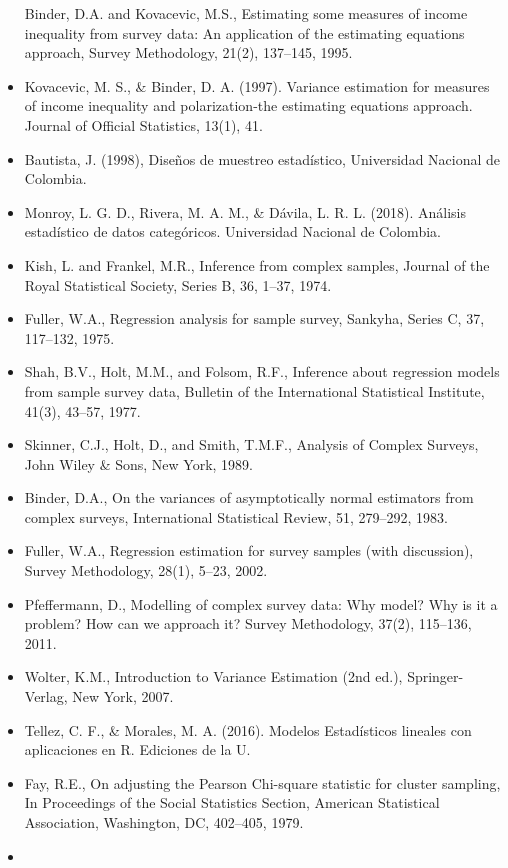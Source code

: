 \documentclass[
  12pt,
]{book}
\begin{document}
\begin{itemize}
  Binder, D.A. and Kovacevic, M.S., Estimating some measures of income inequality from survey data: An application of the estimating equations approach, Survey Methodology, 21(2), 137--145, 1995.
\item
  Kovacevic, M. S., \& Binder, D. A. (1997). Variance estimation for measures of income inequality and polarization-the estimating equations approach. Journal of Official Statistics, 13(1), 41.
\item
  Bautista, J. (1998), Diseños de muestreo estadístico, Universidad Nacional de Colombia.
\item
  Monroy, L. G. D., Rivera, M. A. M., \& Dávila, L. R. L. (2018). Análisis estadístico de datos categóricos. Universidad Nacional de Colombia.
\item
  Kish, L. and Frankel, M.R., Inference from complex samples, Journal of the Royal Statistical Society, Series B, 36, 1--37, 1974.
\item
  Fuller, W.A., Regression analysis for sample survey, Sankyha, Series C, 37, 117--132, 1975.
\item
  Shah, B.V., Holt, M.M., and Folsom, R.F., Inference about regression models from sample survey data, Bulletin of the International Statistical Institute, 41(3), 43--57, 1977.
\item
  Skinner, C.J., Holt, D., and Smith, T.M.F., Analysis of Complex Surveys, John Wiley \& Sons, New York, 1989.
\item
  Binder, D.A., On the variances of asymptotically normal estimators from complex surveys, International Statistical Review, 51, 279--292, 1983.
\item
  Fuller, W.A., Regression estimation for survey samples (with discussion), Survey Methodology, 28(1), 5--23, 2002.
\item
  Pfeffermann, D., Modelling of complex survey data: Why model? Why is it a problem? How can we approach it? Survey Methodology, 37(2), 115--136, 2011.
\item
  Wolter, K.M., Introduction to Variance Estimation (2nd ed.), Springer-Verlag, New York, 2007.
\item
  Tellez, C. F., \& Morales, M. A. (2016). Modelos Estadísticos lineales con aplicaciones en R. Ediciones de la U.
\item
  Fay, R.E., On adjusting the Pearson Chi-square statistic for cluster sampling, In Proceedings of the Social Statistics Section, American Statistical Association, Washington, DC, 402--405, 1979.
\item

\end{itemize}
\end{document}
